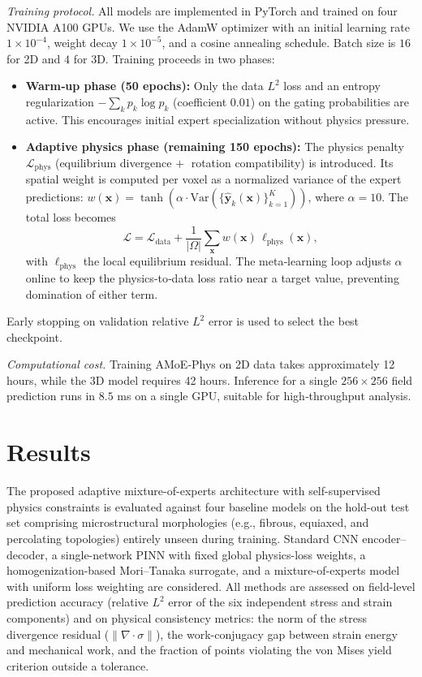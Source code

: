 \documentclass{article}
\begin{document}
\textit{Training protocol.} All models are implemented in PyTorch and trained on four NVIDIA A100 GPUs. We use the AdamW optimizer with an initial learning rate $1\times10^{-4}$, weight decay $1\times10^{-5}$, and a cosine annealing schedule. Batch size is $16$ for 2D and $4$ for 3D. Training proceeds in two phases:
\begin{itemize}
    \item \textbf{Warm‑up phase (50 epochs):} Only the data $L^2$ loss and an entropy regularization $-\sum_{k} p_k \log p_k$ (coefficient $0.01$) on the gating probabilities are active. This encourages initial expert specialization without physics pressure.
    \item \textbf{Adaptive physics phase (remaining 150 epochs):} The physics penalty $\mathcal{L}_{\text{phys}}$ (equilibrium divergence $+\;$ rotation compatibility) is introduced. Its spatial weight is computed per voxel as a normalized variance of the expert predictions: $w(\mathbf{x}) = \tanh(\alpha \cdot \text{Var}(\{\hat{\mathbf{y}}_k(\mathbf{x})\}_{k=1}^K))$, where $\alpha=10$. The total loss becomes 
    \[
    \mathcal{L} = \mathcal{L}_{\text{data}} + \frac{1}{|\Omega|}\sum_{\mathbf{x}} w(\mathbf{x}) \, \ell_{\text{phys}}(\mathbf{x}),
    \]
    with $\ell_{\text{phys}}$ the local equilibrium residual. The meta‑learning loop adjusts $\alpha$ online to keep the physics‑to‑data loss ratio near a target value, preventing domination of either term.
\end{itemize}
Early stopping on validation relative $L^2$ error is used to select the best checkpoint.

\textit{Computational cost.} Training AMoE‑Phys on 2D data takes approximately 12 hours, while the 3D model requires 42 hours. Inference for a single $256\times256$ field prediction runs in $8.5$ ms on a single GPU, suitable for high‑throughput analysis.

\section{Results}

The proposed adaptive mixture-of-experts architecture with self-supervised physics constraints is evaluated against four baseline models on the hold-out test set comprising microstructural morphologies (e.g., fibrous, equiaxed, and percolating topologies) entirely unseen during training. Standard CNN encoder–decoder, a single-network PINN with fixed global physics-loss weights, a homogenization-based Mori–Tanaka surrogate, and a mixture-of-experts model with uniform loss weighting are considered. All methods are assessed on field-level prediction accuracy (relative \(L^2\) error of the six independent stress and strain components) and on physical consistency metrics: the norm of the stress divergence residual (\(\|\nabla\cdot\sigma\|\)), the work-conjugacy gap between strain energy and mechanical work, and the fraction of points violating the von Mises yield criterion outside a tolerance.
\end{document}
